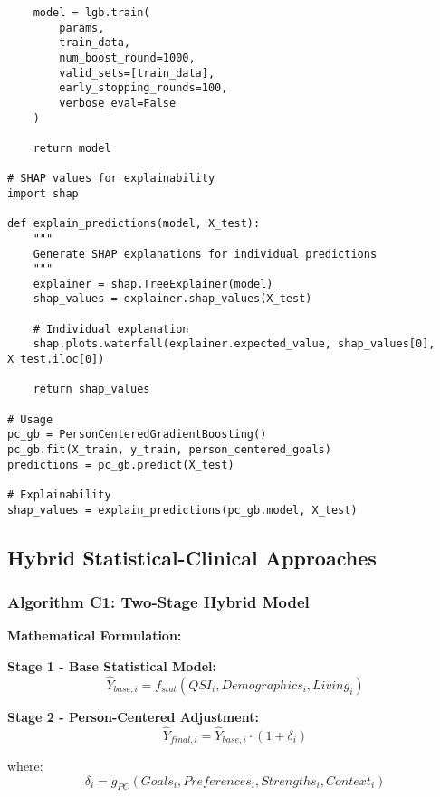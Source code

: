 \documentclass[12pt]{article}
\begin{document}
\begin{lstlisting}
    model = lgb.train(
        params, 
        train_data, 
        num_boost_round=1000,
        valid_sets=[train_data],
        early_stopping_rounds=100,
        verbose_eval=False
    )
    
    return model

# SHAP values for explainability
import shap

def explain_predictions(model, X_test):
    """
    Generate SHAP explanations for individual predictions
    """
    explainer = shap.TreeExplainer(model)
    shap_values = explainer.shap_values(X_test)
    
    # Individual explanation
    shap.plots.waterfall(explainer.expected_value, shap_values[0], X_test.iloc[0])
    
    return shap_values

# Usage
pc_gb = PersonCenteredGradientBoosting()
pc_gb.fit(X_train, y_train, person_centered_goals)
predictions = pc_gb.predict(X_test)

# Explainability
shap_values = explain_predictions(pc_gb.model, X_test)
\end{lstlisting}

\subsection{Hybrid Statistical-Clinical Approaches}

\subsubsection{Algorithm C1: Two-Stage Hybrid Model}

\textbf{Mathematical Formulation:}

\textbf{Stage 1 - Base Statistical Model:}
\begin{equation}
\hat{Y}_{base,i} = f_{stat}(QSI_i, Demographics_i, Living_{i})
\end{equation}

\textbf{Stage 2 - Person-Centered Adjustment:}
\begin{equation}
\hat{Y}_{final,i} = \hat{Y}_{base,i} \cdot (1 + \delta_i)
\end{equation}

where:
\begin{equation}
\delta_i = g_{PC}(Goals_i, Preferences_i, Strengths_i, Context_i)
\end{equation}
\end{document}
